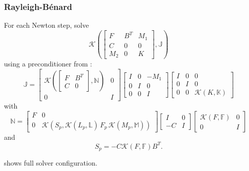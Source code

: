 \documentclass[presentation,aspectratio=43]{beamer}
\newcommand{\KSP}[2]{\ensuremath{\mathcal{K}\left(#1, \mathbb{#2}\right)}}
\newcommand{\ksp}[1]{\KSP{#1}{#1}}
\begin{document}
\begin{frame}
  \frametitle{Rayleigh-B\'enard}
  {\small
  For each Newton step, solve
  \begin{equation*}
    \KSP{\begin{bmatrix}
        F & B^T & M_1\\
        C & 0 & 0 \\
        M_2 & 0 & K
      \end{bmatrix}}{J}
  \end{equation*}
  using a preconditioner from \textcite{Howle:2012}:
  \begin{equation*}
    \mathbb{J} =
    \begin{bmatrix}
      \KSP{\begin{bmatrix}
          F & B^T\\
          C & 0
        \end{bmatrix}}{N} & 0\\
      0 & I
    \end{bmatrix}
    \begin{bmatrix}
      I & 0 & -M_1\\
      0 & I & 0 \\
      0 & 0 & I
    \end{bmatrix}
    \begin{bmatrix}
      I & 0 & 0\\
      0 & I & 0\\
      0 & 0 &\ksp{K}
    \end{bmatrix}
  \end{equation*}
  with
  \begin{equation*}
    \mathbb{N} = \begin{bmatrix}
      F & 0 \\
      0 & \mathcal{K}(S_p, \KSP{L_p}{L}\,F_p \, \KSP{M_p}{M})
    \end{bmatrix}
    \begin{bmatrix}
      I & 0\\
      -C & I
    \end{bmatrix}
    \begin{bmatrix}
      \ksp{F} & 0 \\
      0 & I
    \end{bmatrix}
  \end{equation*}
  and
  \begin{equation*}
    S_p = -C \ksp{F} B^T.
  \end{equation*}

  \begin{flushright}
    {\tiny \textcite[\S B.4]{Kirby:2018} shows full solver configuration.}
  \end{flushright}
  }
\end{frame}
\end{document}
